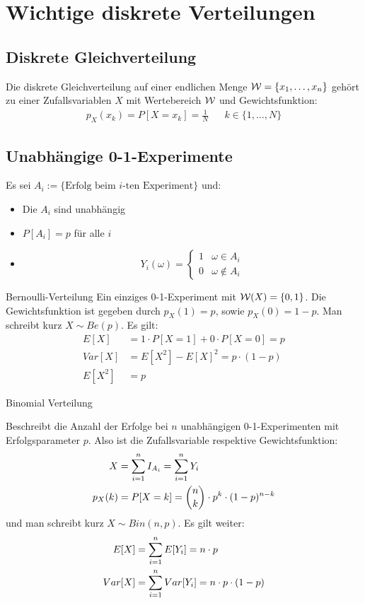 \section{Wichtige diskrete Verteilungen}
\subsection{Diskrete Gleichverteilung}
Die diskrete Gleichverteilung auf einer endlichen Menge $\mathcal{W} = \{ x_1, \dots,
  x_n \}$ gehört zu einer Zufallsvariablen $X$ mit Wertebereich $\mathcal{W}$ und
Gewichtsfunktion:
\begin{align*}
  p_X (x_k) = P[X = x_k] = \frac{1}{N} &  & k \in \{1, \dots, N\}
\end{align*}
\subsection{Unabhängige 0-1-Experimente}
Es sei $A_i := \{\text{Erfolg beim $i$-ten Experiment}\}$ und:
\begin{itemize}
  \item Die $A_i$ sind unabhängig
  \item $P[A_i] = p$ für alle $i$
  \item \[
          Y_i (\omega) =
          \begin{cases}
            1 & \omega \in A_i      \\
            0 & \omega \not \in A_i
          \end{cases}
        \]
\end{itemize}
\begin{definition}{Bernoulli-Verteilung}
  Ein einziges 0-1-Experiment mit $\mathcal{W} (X) = \{0, 1\}$. Die Gewichtsfunktion ist
  gegeben durch $p_X (1) = p$, sowie $p_X (0) = 1-p$. Man schreibt kurz $X \sim
    Be (p)$. Es gilt:
  \begin{align*}
    E[X]   & = 1 \cdot P[X = 1] + 0 \cdot P[X = 0] = p \\
    Var[X] & = E[X^2] - {E[X]}^2 = p \cdot  (1-p)      \\
    E[X^2] & = p
  \end{align*}
\end{definition}
\begin{definition}{Binomial Verteilung}

  Beschreibt die Anzahl der Erfolge bei $n$ unabhängigen 0-1-Experimenten mit
  Erfolgsparameter $p$. Also ist die Zufallsvariable respektive Gewichtsfunktion:
  \begin{align*}
    X       & = \sum_{i = 1}^n I_{A_i} = \sum_{i = 1}^n Y_i                                \\
    p_X (k) & = P[X = k] = \binom{n}{k} \cdot p^k \cdot  (1-p)^{n-k}
  \end{align*}
  und man schreibt kurz $X \sim Bin (n, p)$. Es gilt weiter:
  \begin{align*}
    E[X]   & = \sum_{i = 1}^n E[Y_i] = n \cdot p                \\
    Var[X] & = \sum_{i = 1}^n Var[Y_i] = n \cdot p \cdot  (1-p) \\
  \end{align*}
\end{definition}
